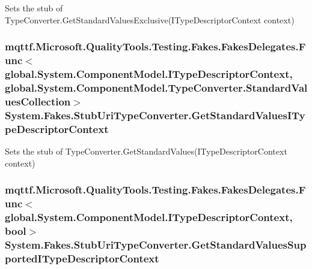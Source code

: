 Sets the stub of Type\-Converter.\-Get\-Standard\-Values\-Exclusive(\-I\-Type\-Descriptor\-Context context)

\hypertarget{class_system_1_1_fakes_1_1_stub_uri_type_converter_a6a9b4574e4e9067bfe9049fb08535d82}{
\subsubsection[{Get\-Standard\-Values\-I\-Type\-Descriptor\-Context}]{\setlength{\rightskip}{0pt plus 5cm}mqttf.\-Microsoft.\-Quality\-Tools.\-Testing.\-Fakes.\-Fakes\-Delegates.\-Func$<$global.\-System.\-Component\-Model.\-I\-Type\-Descriptor\-Context, global.\-System.\-Component\-Model.\-Type\-Converter.\-Standard\-Values\-Collection$>$ System.\-Fakes.\-Stub\-Uri\-Type\-Converter.\-Get\-Standard\-Values\-I\-Type\-Descriptor\-Context}}\label{class_system_1_1_fakes_1_1_stub_uri_type_converter_a6a9b4574e4e9067bfe9049fb08535d82}


Sets the stub of Type\-Converter.\-Get\-Standard\-Values(\-I\-Type\-Descriptor\-Context context)

\hypertarget{class_system_1_1_fakes_1_1_stub_uri_type_converter_a5cb2f99783da179b332751b6ea60281f}{
\subsubsection[{Get\-Standard\-Values\-Supported\-I\-Type\-Descriptor\-Context}]{\setlength{\rightskip}{0pt plus 5cm}mqttf.\-Microsoft.\-Quality\-Tools.\-Testing.\-Fakes.\-Fakes\-Delegates.\-Func$<$global.\-System.\-Component\-Model.\-I\-Type\-Descriptor\-Context, bool$>$ System.\-Fakes.\-Stub\-Uri\-Type\-Converter.\-Get\-Standard\-Values\-Supported\-I\-Type\-Descriptor\-Context}}\label{class_system_1_1_fakes_1_1_stub_uri_type_converter_a5cb2f99783da179b332751b6ea60281f}


